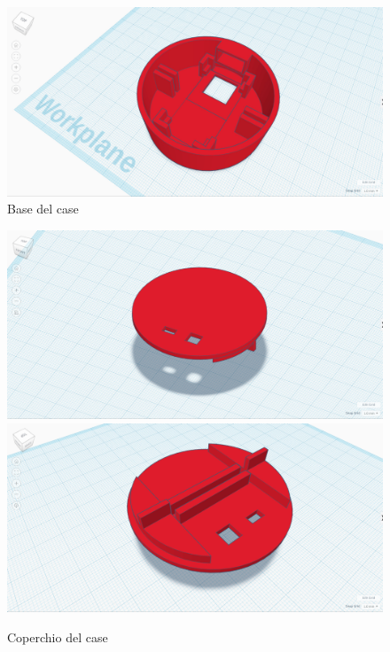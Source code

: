 \begin{figure}[H]
	\centering
	\includegraphics[width=\textwidth]{Chapter03/res/openldat_case_base1.jpg}
	\caption{Base del case}
	\label{fig:case_base}
\end{figure}
\begin{figure}[H]
	\centering
	\includegraphics[width=\textwidth]{Chapter03/res/openldat_case_top1.jpg}
	\includegraphics[width=\textwidth]{Chapter03/res/openldat_case_top2.jpg}
	\caption{Coperchio del case}
	\label{fig:case_top}
\end{figure}
